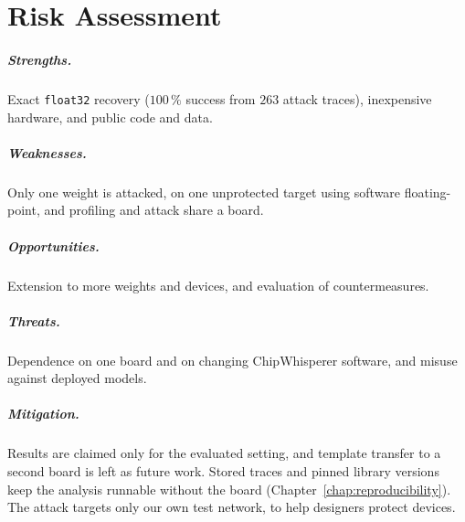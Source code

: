\chapter{Risk Assessment}
\label{chap:risks}

\paragraph{Strengths.}
Exact \texttt{float32} recovery ($100\,\%$ success from $263$ attack traces),
inexpensive hardware, and public code and data.

\paragraph{Weaknesses.}
Only one weight is attacked, on one unprotected target using software
floating-point, and profiling and attack share a board.

\paragraph{Opportunities.}
Extension to more weights and devices, and evaluation of countermeasures.

\paragraph{Threats.}
Dependence on one board and on changing ChipWhisperer software, and misuse
against deployed models.

\paragraph{Mitigation.}
Results are claimed only for the evaluated setting, and template transfer to a
second board is left as future work. Stored traces and pinned library versions keep the
analysis runnable without the board (Chapter~\ref{chap:reproducibility}). The
attack targets only our own test network, to help designers protect devices.
